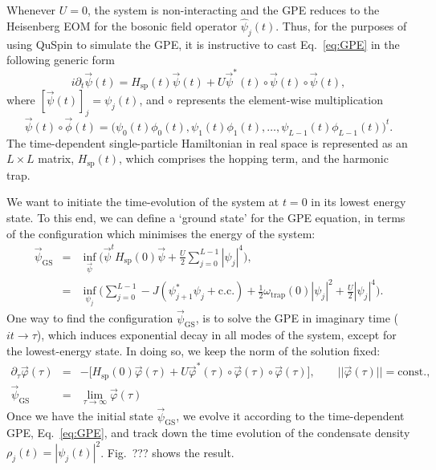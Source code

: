 \documentclass{SciPost}
\newcommand\0{\scalebox{-1}[1]{0}}
\begin{document}
Whenever $U=0$, the system is non-interacting and the GPE reduces to the Heisenberg EOM for the bosonic field operator $\hat\psi_j(t)$. Thus, for the purposes of using QuSpin to simulate the GPE, it is instructive to cast Eq.~\eqref{eq:GPE} in the following generic form
\begin{equation}
i\partial_t\vec{\psi}(t) = H_\mathrm{sp}(t)\vec{\psi}(t) + U \vec{\psi}^*(t)\circ \vec{\psi}(t)\circ \vec{\psi}(t), 
\end{equation}  
where $[\vec{\psi}(t)]_j = \psi_j(t)$, and $\circ$ represents the element-wise multiplication 
\begin{equation*}
\vec{\psi}(t)\circ \vec{\phi}(t) = \bigg(\psi_0(t)\phi_0(t), \psi_1(t)\phi_1(t),\dots, \psi_{L-1}(t)\phi_{L-1}(t) \bigg)^t.
\end{equation*}
The time-dependent single-particle Hamiltonian in real space is represented as an $L\times L$ matrix, $H_\mathrm{sp}(t)$, which comprises the hopping term, and the harmonic trap.

We want to initiate the time-evolution of the system at $t=0$ in its lowest energy state. To this end, we can define a `ground state' for the GPE equation, in terms of the configuration which minimises the energy of the system:
\begin{eqnarray}
\vec\psi_\mathrm{GS} &=& \inf_{\vec{\psi}} \bigg( \vec{\psi}^t H_\mathrm{sp}(0)\vec{\psi} + \frac{U}{2}\sum_{j=0}^{L-1}|\psi_j|^4\bigg),\nonumber\\
&=&\inf_{\psi_j} \bigg(\sum_{j=0}^{L-1} -J(\psi_{j+1}^*\psi_j + \mathrm{c.c.}) + \frac{1}{2}\omega_\mathrm{trap}(0)|\psi_j|^2 + \frac{U}{2}|\psi_j|^4\bigg).
\end{eqnarray} 
One way to find the configuration $\vec\psi_\mathrm{GS}$, is to solve the GPE in imaginary time ($it\to \tau$), which induces exponential decay in all modes of the system, except for the lowest-energy state. In doing so, we keep the norm of the solution fixed:
\begin{eqnarray}
\label{eq:GPE_imag}
\partial_{\tau}\vec\varphi(\tau) &=& -\bigg[H_\mathrm{sp}(0)\vec\varphi(\tau) + U \vec\varphi^*(\tau)\circ \vec\varphi(\tau)\circ \vec\varphi(\tau)\bigg],\qquad ||\vec\varphi(\tau)||=\mathrm{const.},\nonumber\\
\vec{\psi}_\mathrm{GS} &=& \lim_{\tau\to\infty}\vec\varphi(\tau)
\end{eqnarray}
Once we have the initial state $\vec\psi_\mathrm{GS}$, we evolve it according to the time-dependent GPE, Eq.~\eqref{eq:GPE}, and track down the time evolution of the condensate density $\rho_j(t)=|\psi_j(t)|^2$. Fig.~??? shows the result.
\end{document}
